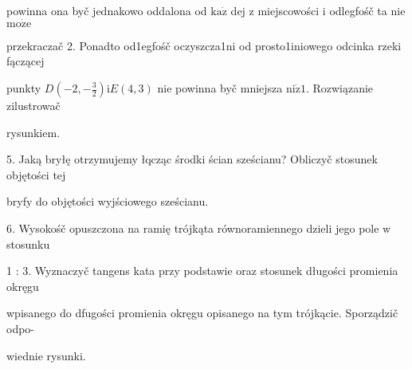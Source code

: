\documentclass[a4paper,12pt]{article}
\begin{document}
powinna ona byč jednakowo oddalona od $\mathrm{k}\mathrm{a}\dot{\mathrm{z}}$ dej $\mathrm{z}$ miejscowości $\mathrm{i}$ odlegfośč ta nie $\mathrm{m}\mathrm{o}\dot{\mathrm{z}}\mathrm{e}$

przekraczač 2. Ponadto od1egfośč oczyszcza1ni od prosto1iniowego odcinka rzeki fączącej

punkty $D(-2,-\displaystyle \frac{3}{2}) \mathrm{i}E(4,3)$ nie powinna byč mniejsza $\mathrm{n}\mathrm{i}\dot{\mathrm{z}} 1$. Rozwiązanie zilustrowač

rysunkiem.

5. Jaką bryłę otrzymujemy łqcząc środki ścian sześcianu? Obliczyč stosunek objętości tej

bryfy do objętości wyjściowego sześcianu.

6. Wysokośč opuszczona na ramię trójkąta równoramiennego dzieli jego pole $\mathrm{w}$ stosunku

1 : 3. Wyznaczyč tangens kata przy podstawie oraz stosunek długości promienia okręgu

wpisanego do dfugości promienia okręgu opisanego na tym trójkącie. Sporządzič odpo-

wiednie rysunki.
\end{document}
